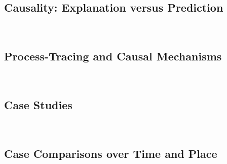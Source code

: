\documentclass[12pt,a4paper]{article}
\newcommand{\lecture}[3][\DefaultOpt]{%
  \def\DefaultOpt{#2}%
  \clearpage\subsection[#1]{#2}\emph{#3}\vspace{.25em}\\
}
\newcommand{\reading}[2][]{\noindent -- {#1}\bibentry{#2}.\vspace{.25em}\\}
\begin{document}
\lecture{Causality: Explanation versus Prediction}{}


\lecture{Process-Tracing and Causal Mechanisms}{}

\lecture{Case Studies}{}

\lecture{Case Comparisons over Time and Place}{}
\end{document}
